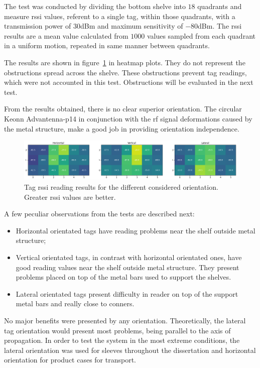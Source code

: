 The test was conducted by dividing the bottom shelve into $18$ quadrants and measure \ac{rssi} values, referent to a single tag, within those quadrants, with a transmission power of $30$dBm and maximum sensitivity of $-80$dBm. The \ac{rssi} results are a mean value calculated from $1000$ values sampled from each quadrant in a uniform motion, repeated in same manner between quadrants.

The results are shown in figure~\ref{fig:tagorientationsresults} in heatmap plots.
They do not represent the obstructions spread across the shelve. These obstructions prevent tag readings, which were not accounted in this test. Obstructions will be evaluated in the next test.

From the results obtained, there is no clear superior orientation. The circular Keonn Advantenna-p14 in conjunction with the \ac{rf} signal deformations caused by the metal structure, make a good job in providing orientation independence.

\begin{figure}
    \centering
    \includegraphics[width=\textwidth]{figs/tests/RSSI_shelve1.png}
    \caption{Tag \ac{rssi} reading results for the different considered orientation. Greater \ac{rssi} values are better.}
    \label{fig:tagorientationsresults}
\end{figure}

A few peculiar observations from the tests are described next:

\begin{itemize}
    \item Horizontal orientated tags have reading problems near the shelf outside metal structure;
    \item Vertical orientated tags, in contrast with horizontal orientated ones, have good reading values near the shelf outside metal structure. They present problems placed on top of the metal bars used to support the shelves.
    \item Lateral orientated tags present difficulty in reader on top of the support metal bars and really close to conners.
\end{itemize}

No major benefits were presented by any orientation.
Theoretically, the lateral tag orientation would present most problems, being parallel to the axis of propagation.
In order to test the system in the most extreme conditions, the lateral orientation was used for sleeves throughout the dissertation and horizontal orientation for product cases for transport.

